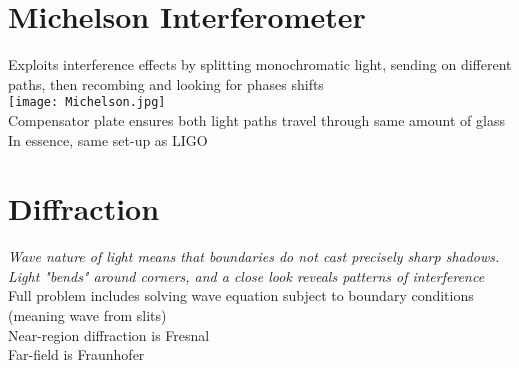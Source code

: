 \documentclass[a4paper, 11pt, fleqn, normalem]{report}
\begin{document}
\section{Michelson Interferometer}
Exploits interference effects by splitting monochromatic light, sending on different paths, then recombing and looking for phases shifts \\
\texttt{[image: Michelson.jpg]} \\
Compensator plate ensures both light paths travel through same amount of glass \\
In essence, same set-up as LIGO

\section{Diffraction}
\emph{Wave nature of light means that boundaries do not cast precisely sharp shadows. Light "bends" around corners, and a close look reveals patterns of interference} \\
Full problem includes solving wave equation subject to boundary conditions (meaning wave from slits) \\
Near-region diffraction is Fresnal \\
Far-field is Fraunhofer
\end{document}
